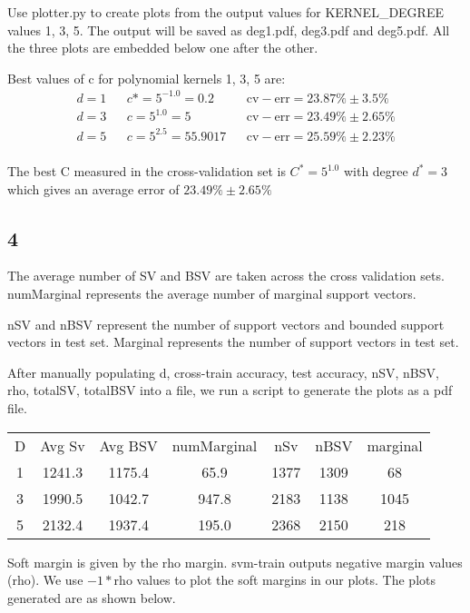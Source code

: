 \documentclass{article}
\begin{document}
Use plotter.py\cite{plotterpy} to create plots from the output values for KERNEL\_DEGREE values 1, 3, 5.  The output will be saved as deg1.pdf, deg3.pdf and deg5.pdf.  All the three plots are embedded below one after the other.




Best values of c for polynomial kernels 1, 3, 5 are:
\begin{align*}
  d = 1 && c* = 5^{-1.0} = 0.2 && \mathrm{cv-err} = 23.87\% \pm 3.5\% \\
  d = 3 && c = 5^{1.0} = 5 && \mathrm{cv-err} = 23.49\% \pm 2.65\%\\
  d = 5 && c = 5^{2.5} = 55.9017 && \mathrm{cv-err} = 25.59\% \pm 2.23\% \\
\end{align*}

The best C measured in the cross-validation set is \( C^{*} = 5^{1.0} \) with degree \( d^{*} = 3 \) which gives an average error of \( 23.49\% \pm 2.65\% \)

\subsection*{4}
The average number of SV and BSV are taken across the cross validation sets. numMarginal represents the average number of marginal support vectors.

nSV and nBSV represent the number of support vectors and bounded support vectors in test set.  Marginal represents the number of support vectors in test set.

After manually populating d, cross-train accuracy, test accuracy, nSV, nBSV, rho, totalSV, totalBSV into a file\cite{ques4file}, we run a script\cite{ques4py} to generate the plots as a pdf file.

\begin{tabular}{*{7}{c}}
  D & Avg Sv & Avg BSV & numMarginal & nSv & nBSV & marginal \\
  1 & 1241.3 & 1175.4 & 65.9 & 1377 & 1309 & 68 \\
  3 & 1990.5 & 1042.7 & 947.8 & 2183 & 1138 & 1045 \\
  5 & 2132.4 & 1937.4 & 195.0 & 2368 & 2150 & 218 \\
\end{tabular}

Soft margin is given by the rho margin.  svm-train outputs negative margin values (rho). We use \(-1 * \mathrm{rho} \) values to plot the soft margins in our plots.
The plots generated are as shown below.
\end{document}
